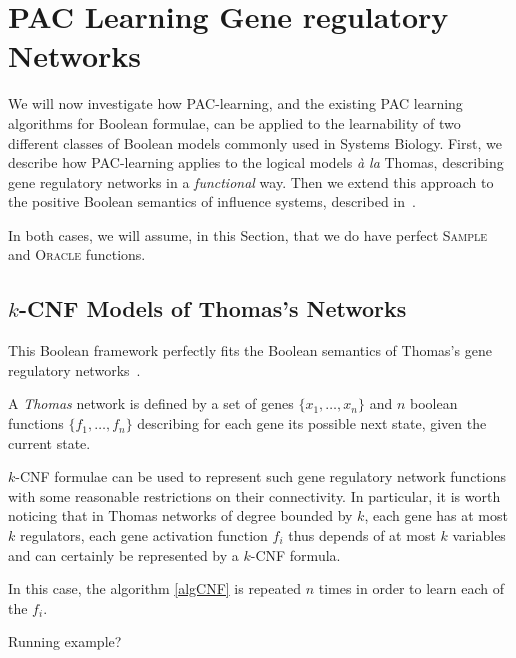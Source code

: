 \documentclass{llncs}
\begin{document}
\section{PAC Learning Gene regulatory Networks}

We will now investigate how PAC-learning, and the existing PAC learning algorithms for Boolean formulae,
can be applied to the
learnability of two different classes of Boolean models commonly used in
Systems Biology. First, we describe how PAC-learning applies to the
logical models \emph{\`a la} Thomas, describing gene regulatory networks in a
\emph{functional} way. Then we extend this approach to the positive Boolean semantics of influence systems, described in~\cite{FMRS16cmsb}.

In both cases, we will assume, in this Section, that we do have perfect
\textsc{Sample} and \textsc{Oracle} functions.

\subsection{$k$-CNF Models of Thomas's Networks}

This Boolean framework perfectly fits the Boolean semantics of Thomas's gene
regulatory networks~\cite{GK73jtb,Thomas73jtb,TA90book}.

\begin{definition}
   A \emph{Thomas} network is defined by a set of genes $\{x_1,\dots,x_n\}$
   and $n$ boolean functions $\{f_1,\dots,f_n\}$ describing for each gene its
   possible next state, given the current state.
\end{definition}



$k$-CNF formulae can be used to represent such gene regulatory network functions with some reasonable restrictions on their connectivity.
In particular, it is worth noticing that in Thomas networks of degree bounded by $k$,
each gene has at most $k$ regulators, each gene activation function $f_i$ thus depends of at most $k$ variables
and can certainly be represented by a $k$-CNF formula.

In this case, the algorithm \ref{algCNF} is repeated $n$ times in order to learn each of the $f_i$.

\begin{example}
   Running example?
\end{example}
\end{document}
